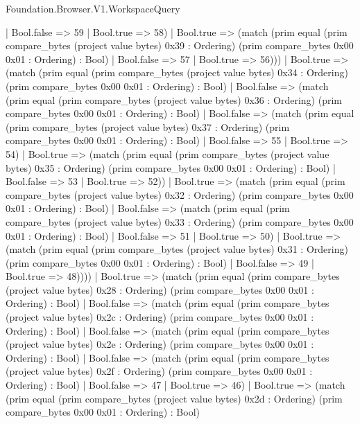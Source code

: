 \begin{lexlean}{Foundation.Browser.V1.WorkspaceQuery}
\begin{semanticmodule}
{                    | Bool.false => 59
                    | Bool.true => 58)
                  | Bool.true => (match (prim equal (prim compare_bytes (project value bytes) 0x39 : Ordering) (prim compare_bytes 0x00 0x01 : Ordering) : Bool)
                    | Bool.false => 57
                    | Bool.true => 56)))
              | Bool.true => (match (prim equal (prim compare_bytes (project value bytes) 0x34 : Ordering) (prim compare_bytes 0x00 0x01 : Ordering) : Bool)
                | Bool.false => (match (prim equal (prim compare_bytes (project value bytes) 0x36 : Ordering) (prim compare_bytes 0x00 0x01 : Ordering) : Bool)
                  | Bool.false => (match (prim equal (prim compare_bytes (project value bytes) 0x37 : Ordering) (prim compare_bytes 0x00 0x01 : Ordering) : Bool)
                    | Bool.false => 55
                    | Bool.true => 54)
                  | Bool.true => (match (prim equal (prim compare_bytes (project value bytes) 0x35 : Ordering) (prim compare_bytes 0x00 0x01 : Ordering) : Bool)
                    | Bool.false => 53
                    | Bool.true => 52))
                | Bool.true => (match (prim equal (prim compare_bytes (project value bytes) 0x32 : Ordering) (prim compare_bytes 0x00 0x01 : Ordering) : Bool)
                  | Bool.false => (match (prim equal (prim compare_bytes (project value bytes) 0x33 : Ordering) (prim compare_bytes 0x00 0x01 : Ordering) : Bool)
                    | Bool.false => 51
                    | Bool.true => 50)
                  | Bool.true => (match (prim equal (prim compare_bytes (project value bytes) 0x31 : Ordering) (prim compare_bytes 0x00 0x01 : Ordering) : Bool)
                    | Bool.false => 49
                    | Bool.true => 48))))
            | Bool.true => (match (prim equal (prim compare_bytes (project value bytes) 0x28 : Ordering) (prim compare_bytes 0x00 0x01 : Ordering) : Bool)
              | Bool.false => (match (prim equal (prim compare_bytes (project value bytes) 0x2c : Ordering) (prim compare_bytes 0x00 0x01 : Ordering) : Bool)
                | Bool.false => (match (prim equal (prim compare_bytes (project value bytes) 0x2e : Ordering) (prim compare_bytes 0x00 0x01 : Ordering) : Bool)
                  | Bool.false => (match (prim equal (prim compare_bytes (project value bytes) 0x2f : Ordering) (prim compare_bytes 0x00 0x01 : Ordering) : Bool)
                    | Bool.false => 47
                    | Bool.true => 46)
                  | Bool.true => (match (prim equal (prim compare_bytes (project value bytes) 0x2d : Ordering) (prim compare_bytes 0x00 0x01 : Ordering) : Bool)
}
\end{semanticmodule}
\end{lexlean}
